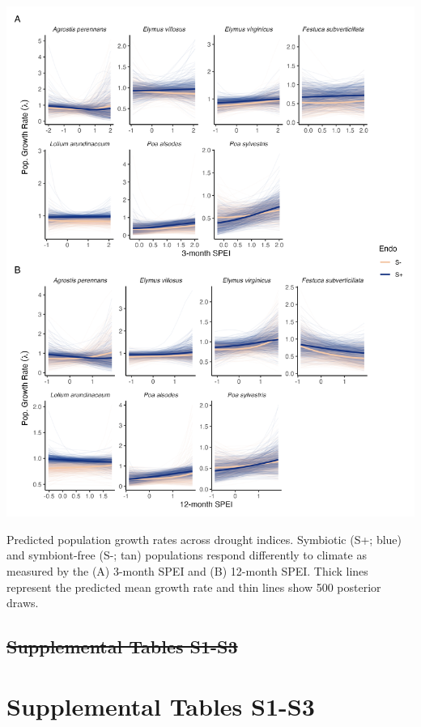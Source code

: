 \documentclass[lineno, sn-basic]{sn-jnl}%
\providecommand{\DIFadd}[1]{{\protect\color{blue}#1}} %
\providecommand{\DIFdel}[1]{{\protect\color{red}\protect\scriptsize\sout{#1}}}
\providecommand{\DIFadd}[1]{{\protect\color{blue}\uwave{#1}}} %
\providecommand{\DIFdel}[1]{{\protect\color{red}\sout{#1}}}                      %
\providecommand{\DIFaddbegin}{} %
\providecommand{\DIFaddend}{} %
\providecommand{\DIFdelbegin}{} %
\providecommand{\DIFdelend}{} %
\newcommand{\DIFscaledelfig}{0.5}
\newlength{\DIFdelgraphicswidth} %
\newlength{\DIFdelgraphicsheight} %
\newcommand{\DIFaddincludegraphics}[2][]{{\color{blue}\fbox{\DIFOincludegraphics[#1]{#2}}}} %
\newcommand{\DIFdelincludegraphics}[2][]{%
\sbox{\DIFdelgraphicsbox}{\DIFOincludegraphics[#1]{#2}}%
\settoboxwidth{\DIFdelgraphicswidth}{\DIFdelgraphicsbox} %
\settoboxtotalheight{\DIFdelgraphicsheight}{\DIFdelgraphicsbox} %
\scalebox{\DIFscaledelfig}{%
\parbox[b]{\DIFdelgraphicswidth}{\usebox{\DIFdelgraphicsbox}\\[-\baselineskip] \rule{\DIFdelgraphicswidth}{0em}}\llap{\resizebox{\DIFdelgraphicswidth}{\DIFdelgraphicsheight}{%
\setlength{\unitlength}{\DIFdelgraphicswidth}%
\begin{picture}(1,1)%
\thicklines\linethickness{2pt} %
{\color[rgb]{1,0,0}\put(0,0){\framebox(1,1){}}}%
{\color[rgb]{1,0,0}\put(0,0){\line( 1,1){1}}}%
{\color[rgb]{1,0,0}\put(0,1){\line(1,-1){1}}}%
\end{picture}%
}\hspace*{3pt}}} %
} %
\DeclareRobustCommand{\DIFaddbegin}{\DIFOaddbegin \let\includegraphics\DIFaddincludegraphics} %
\DeclareRobustCommand{\DIFaddend}{\DIFOaddend \let\includegraphics\DIFOincludegraphics} %
\DeclareRobustCommand{\DIFdelbegin}{\DIFOdelbegin \let\includegraphics\DIFdelincludegraphics} %
\DeclareRobustCommand{\DIFdelend}{\DIFOaddend \let\includegraphics\DIFOincludegraphics} %
\begin{document}
\begin{myfigure}[H]
	\centering
	\includegraphics[width=.7\linewidth]{spei_combo_lambda_plot.png}
	\caption[Predicted population growth rates across drought indices]{\DIFadd{Predicted population growth rates across drought indices. Symbiotic (S+; blue) and symbiont-free (S-; tan) populations respond differently to climate as measured by the (A) 3-month SPEI and (B) 12-month SPEI. Thick lines represent the predicted mean growth rate and thin lines show 500 posterior draws.}}
\end{myfigure}



\DIFaddend \newpage

\DIFdelbegin \subsection*{\DIFdel{Supplemental Tables S1-S3}}
 
\DIFdelend \DIFaddbegin \section{\DIFadd{Supplemental Tables S1-S3}}\label{Suptabs}
\DIFaddend 

\renewcommand\thetable{S\arabic{table}}   
\end{document}
